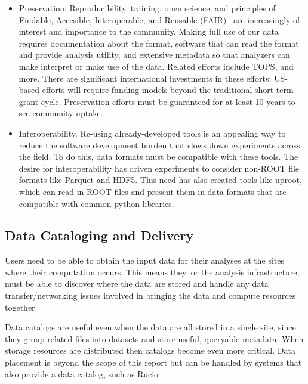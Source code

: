 \begin{itemize}
  \item Preservation.  Reproducibility, training, open science, and principles of Findable, Accesible, Interoperable, and Reusable (FAIR)~\cite{Wilkinson2016} are increasingly of interest and importance to the community.  Making full use of our data requires documentation about the format, software that can read the format and provide analysis utility, and extensive metadata so that analyzers can make interpret or make use of the data.  Related efforts include TOPS, and more.  There are significant international investments in these efforts; US-based efforts will require funding models beyond the traditional short-term grant cycle.  Preservation efforts must be guaranteed for at least 10 years to see community uptake.
  \item Interoperability. Re-using already-developed tools is an appealing way to reduce the software development burden that slows down experiments across the field.  To do this, data formats must be compatible with these tools.  The desire for interoperability has driven experiments to consider non-ROOT file formats like Parquet and HDF5.  This need has also created tools like uproot, which can read in ROOT files and present them in data formats that are compatible with common python libraries.
\end{itemize} 


\subsection{Data Cataloging and Delivery}

Users need to be able to obtain the input data for their analyses at the sites where their computation occurs. This means they, or the analysis infrastructure, must be able to discover where the data are stored and handle any data transfer/networking issues involved in bringing the data and compute resources together.

Data catalogs are useful even when the data are all stored in a single site, since they group related files into datasets and store useful, queryable metadata. When storage resources are distributed then catalogs become even more critical. Data placement is beyond the scope of this report but can be handled by systems that also provide a data catalog, such as Rucio \cite{Barisits:2019fyl}.

